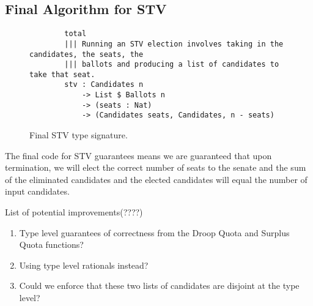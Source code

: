 \subsection{Final Algorithm for STV}

\begin{figure}[ht!!!!!!!]
    \caption{Final STV type signature. }
    \label{stv_idris}
    \begin{lstlisting}
        total
        ||| Running an STV election involves taking in the candidates, the seats, the
        ||| ballots and producing a list of candidates to take that seat. 
        stv : Candidates n 
            -> List $ Ballots n 
            -> (seats : Nat) 
            -> (Candidates seats, Candidates, n - seats)
    \end{lstlisting}
\end{figure}

The final code for STV guarantees means we are guaranteed that upon termination,
we will elect the correct number of seats to the senate and the sum of the
eliminated candidates and the elected candidates will equal the number of input
candidates. 

List of potential improvements(????)
\begin{enumerate}
    \item Type level guarantees of correctness from the Droop Quota and Surplus Quota functions?
    \item Using type level rationals instead?
    \item Could we enforce that these two lists of candidates are disjoint at the type level?
\end{enumerate}